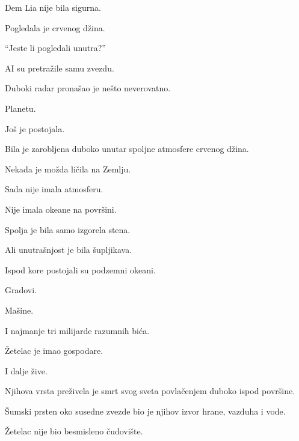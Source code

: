 Dem Lia nije bila sigurna.

\bigskip

Pogledala je crvenog džina.

\bigskip

``Jeste li pogledali unutra?''

\bigskip

AI su pretražile samu zvezdu.

\bigskip

Duboki radar pronašao je nešto neverovatno.

\bigskip

Planetu.

\bigskip

Još je postojala.

\bigskip

Bila je zarobljena duboko unutar spoljne atmosfere crvenog džina.

\bigskip

Nekada je možda ličila na Zemlju.

\bigskip

Sada nije imala atmosferu.

Nije imala okeane na površini.

\bigskip

Spolja je bila samo izgorela stena.

\bigskip

Ali unutrašnjost je bila šupljikava.

\bigskip

Ispod kore postojali su podzemni okeani.

Gradovi.

Mašine.

\bigskip

I najmanje tri milijarde razumnih bića.

\bigskip

Žetelac je imao gospodare.

\bigskip

I dalje žive.

\bigskip

Njihova vrsta preživela je smrt svog sveta povlačenjem duboko ispod površine.

\bigskip

Šumski prsten oko susedne zvezde bio je njihov izvor hrane, vazduha i vode.

\bigskip

Žetelac nije bio besmisleno čudovište.

\bigskip

